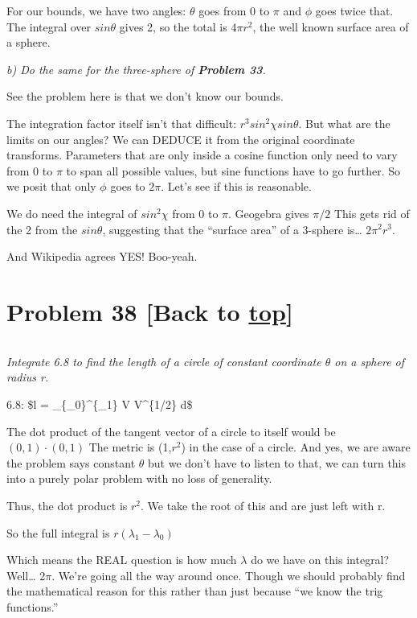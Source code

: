 \documentclass[landscape,letterpaper,10pt,english]{article}
\begin{document}
For our bounds, we have two angles: \(\theta\) goes from 0 to \(\pi\)
and \(\phi\) goes twice that. The integral over \(sin\theta\) gives 2,
so the total is \(4\pi r^2\), the well known surface area of a sphere.

    \emph{b) Do the same for the three-sphere of \textbf{Problem 33}.}

    See the problem here is that we don't know our bounds.

The integration factor itself isn't that difficult:
\(r^3sin^2\chi sin\theta\). But what are the limits on our angles? We
can DEDUCE it from the original coordinate transforms. Parameters that
are only inside a cosine function only need to vary from 0 to \(\pi\) to
span all possible values, but sine functions have to go further. So we
posit that only \(\phi\) goes to \(2\pi.\) Let's see if this is
reasonable.

We do need the integral of \(sin^2\chi\) from 0 to \(\pi\). Geogebra
gives \(\pi/2\) This gets rid of the 2 from the \(sin\theta\),
suggesting that the ``surface area'' of a 3-sphere is\ldots{}
\(2\pi^2r^3\).

And Wikipedia agrees YES! Boo-yeah.

    \hypertarget{problem-38-back-to-top}{%
\section{\texorpdfstring{Problem 38 {[}Back to
\hyperref[toc]{top}{]}}{Problem 38 {[}Back to {]}}}\label{problem-38-back-to-top}}

\[\label{P38}\]

\emph{Integrate 6.8 to find the length of a circle of constant
coordinate \(\theta\) on a sphere of radius r.}

6.8: \$l = \int\_\{\lambda\_0\}\^{}\{\lambda\_1\} \textbar{}\vec V
\cdot \vec V\textbar\^{}\{1/2\} d\lambda \$

The dot product of the tangent vector of a circle to itself would be
\((0,1) \cdot (0,1)\) The metric is (1,\(r^2\)) in the case of a circle.
And yes, we are aware the problem says constant \(\theta\) but we don't
have to listen to that, we can turn this into a purely polar problem
with no loss of generality.

Thus, the dot product is \(r^2\). We take the root of this and are just
left with r.

So the full integral is \(r(\lambda_1 - \lambda_0)\)

Which means the REAL question is how much \(\lambda\) do we have on this
integral? Well\ldots{} 2\(\pi\). We're going all the way around once.
Though we should probably find the mathematical reason for this rather
than just because ``we know the trig functions.''
\end{document}
